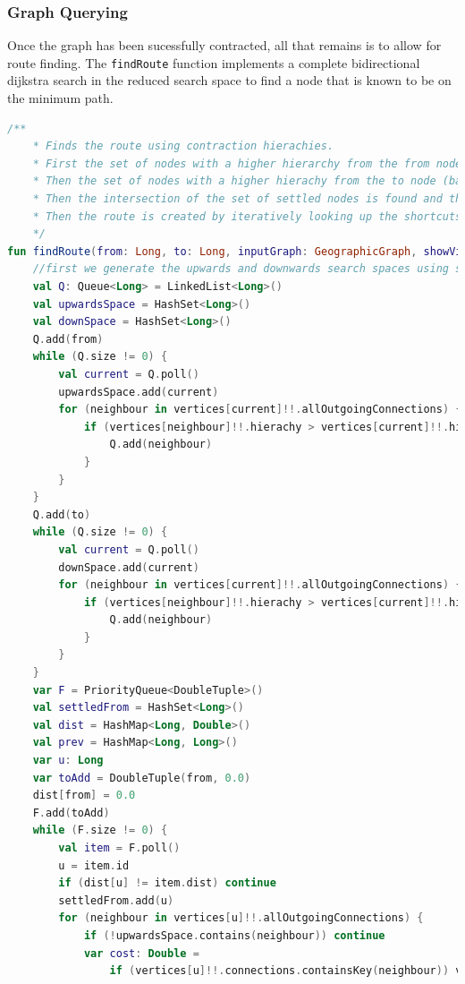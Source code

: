 \documentclass[11pt,twoside,a4paper]{report}
\begin{document}
\subsubsection{Graph Querying}
Once the graph has been sucessfully contracted, all that remains is to allow for route finding. 
The \texttt{findRoute} function implements a complete bidirectional dijkstra search in the reduced search space to find a node that is known to be on the minimum path.
\begin{lstlisting}[language=kotlin]
/**
    * Finds the route using contraction hierachies.
    * First the set of nodes with a higher hierarchy from the from node are calculated
    * Then the set of nodes with a higher hierachy from the to node (backwards) are calculated
    * Then the intersection of the set of settled nodes is found and the minimum found
    * Then the route is created by iteratively looking up the shortcuts
    */
fun findRoute(from: Long, to: Long, inputGraph: GeographicGraph, showVisited: Boolean): List<Long> {
    //first we generate the upwards and downwards search spaces using simple queues
    val Q: Queue<Long> = LinkedList<Long>()
    val upwardsSpace = HashSet<Long>()
    val downSpace = HashSet<Long>()
    Q.add(from)
    while (Q.size != 0) {
        val current = Q.poll()
        upwardsSpace.add(current)
        for (neighbour in vertices[current]!!.allOutgoingConnections) {
            if (vertices[neighbour]!!.hierachy > vertices[current]!!.hierachy && !upwardsSpace.contains(neighbour)) {
                Q.add(neighbour)
            }
        }
    }
    Q.add(to)
    while (Q.size != 0) {
        val current = Q.poll()
        downSpace.add(current)
        for (neighbour in vertices[current]!!.allOutgoingConnections) {
            if (vertices[neighbour]!!.hierachy > vertices[current]!!.hierachy && !downSpace.contains(neighbour)) {
                Q.add(neighbour)
            }
        }
    }
    var F = PriorityQueue<DoubleTuple>()
    val settledFrom = HashSet<Long>()
    val dist = HashMap<Long, Double>()
    val prev = HashMap<Long, Long>()
    var u: Long
    var toAdd = DoubleTuple(from, 0.0)
    dist[from] = 0.0
    F.add(toAdd)
    while (F.size != 0) {
        val item = F.poll()
        u = item.id
        if (dist[u] != item.dist) continue
        settledFrom.add(u)
        for (neighbour in vertices[u]!!.allOutgoingConnections) {
            if (!upwardsSpace.contains(neighbour)) continue
            var cost: Double =
                if (vertices[u]!!.connections.containsKey(neighbour)) vertices[u]!!.connections[neighbour]!!

\end{lstlisting}
\end{document}
